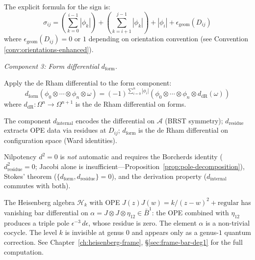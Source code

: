 \begin{definition}
The explicit formula for the sign is:
\[\sigma_{ij} = \left(\sum_{k=0}^{i-1} |\phi_k|\right) + \left(\sum_{k=i+1}^{j-1} |\phi_k|\right) + |\phi_i| + \epsilon_{\text{geom}}(D_{ij})\]
where $\epsilon_{\text{geom}}(D_{ij}) = 0$ or $1$ depending on orientation convention (see Convention \ref{conv:orientations-enhanced}).

\emph{Component 3: Form differential $d_{\text{form}}$.}

Apply the de Rham differential to the form component:
\[d_{\text{form}}\left(\phi_0 \otimes \cdots \otimes \phi_n \otimes \omega\right) = (-1)^{\sum_{i=0}^n |\phi_i|} \left(\phi_0 \otimes \cdots \otimes \phi_n \otimes d_{\text{dR}}(\omega)\right)\]
where $d_{\text{dR}}: \Omega^n \to \Omega^{n+1}$ is the de Rham differential on forms.

\end{definition}

\begin{remark}\label{rem:three-components}
The component $d_{\text{internal}}$ encodes the differential on $\mathcal{A}$ (BRST symmetry); $d_{\text{residue}}$ extracts OPE data via residues at $D_{ij}$; $d_{\text{form}}$ is the de Rham differential on configuration space (Ward identities).

Nilpotency $d^2 = 0$ is \emph{not} automatic and requires the Borcherds identity ($d_{\text{residue}}^2 = 0$; Jacobi alone is insufficient---Proposition~\ref{prop:pole-decomposition}), Stokes' theorem ($\{d_{\text{form}}, d_{\text{residue}}\} = 0$), and the derivation property ($d_{\text{internal}}$ commutes with both).
\end{remark}

\begin{example}\label{ex:heisenberg-d-deg1}
\label{ex:free-boson-d-deg1}
The Heisenberg algebra $\mathcal{H}_k$ with OPE $J(z)J(w) = k/(z-w)^2 + \text{regular}$ has
vanishing bar differential on $\alpha = J \otimes J \otimes \eta_{12} \in \bar{B}^1$: the OPE combined with $\eta_{12}$ produces a triple pole $\epsilon^{-3}\,d\epsilon$, whose residue is zero.  The element $\alpha$ is a non-trivial cocycle.  The level $k$ is invisible at genus $0$ and appears only as a genus-$1$ quantum correction.  See Chapter~\ref{ch:heisenberg-frame}, \S\ref{sec:frame-bar-deg1} for the full computation.
\end{example}

